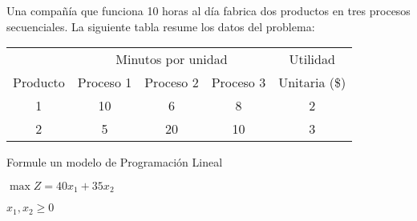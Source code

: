 \question
\label{act:taha_02-02A-04}
  Una compañía que funciona 10 horas al día fabrica dos productos en tres procesos secuenciales. La siguiente tabla resume los datos del problema:

  {
    \centering
    \begin{tabular}{ccccc}
      \toprule
      &\multicolumn{3}{c}{Minutos por unidad}&Utilidad\\
      \cmidrule{2-4}
      Producto& Proceso 1& Proceso 2& Proceso 3& Unitaria (\$)\\
      \midrule
1&10&6&8&2\\
      2&5&20&10&3\\
      \bottomrule
    \end{tabular}
    \par
  }
  
  Formule un modelo de Programación Lineal

  \begin{solution}
  
    {
      \centering
      $\max Z = 40x_1 + 35x_2$
%
    
    \vspace{5mm}
    
    $x_1, x_2 \geq 0$
      \par
    }
    
  \end{solution}


